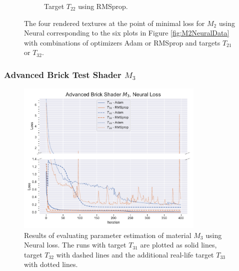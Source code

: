 \begin{figure}[h]
\begin{subfigure}[t]{.25\textwidth}
    \caption{Target $T_{22}$ using RMSprop.}
    \label{fig:M2NeuralFinalRendersRandomRMSprop}
\end{subfigure}
\caption{The four rendered textures at the point of minimal loss for $M_2$ using Neural corresponding to the six plots in Figure \ref{fig:M2NeuralData} with combinations of optimizers Adam or RMSprop and targets $T_{21}$ or $T_{32}$.}
\label{fig:M2NeuralFinalRenders}
\end{figure}


\subsubsection{Advanced Brick Test Shader $M_3$}

\begin{figure}[h]
    \centering
    \includegraphics[width=0.8\textwidth]{img/evaluation/M3/ABS_NEURAL.pdf}
    \caption{Results of evaluating parameter estimation of material $M_3$ using Neural loss. The runs with target $T_{31}$ are plotted as solid lines, target $T_{32}$ with dashed lines and the additional real-life target $T_{33}$ with dotted lines.}
    \label{fig:M3NeuralData}
\end{figure}

